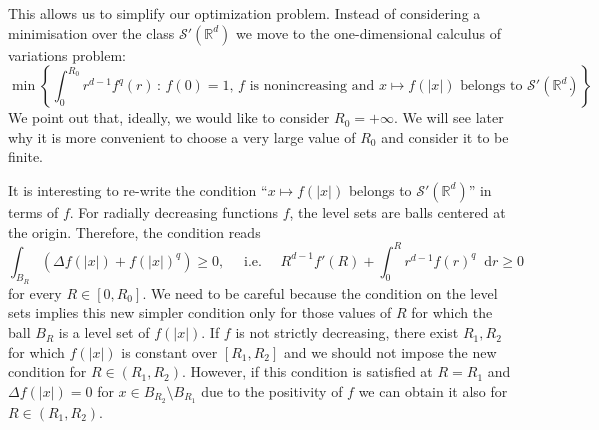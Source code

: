 \documentclass[11pt,a4paper]{article}
\numberwithin{equation}{section}
\newcommand{\R}{{\mathbb{R}}}
\newcommand{\Rd}{{\R^d}}
\theoremstyle{plain}
\newtheorem{lemma}[theorem]{Lemma}
\theoremstyle{remark}
\newcommand {\f}{\frac}
\newcommand{\diff}{\mathop{}\!\mathrm{d}}
\begin{document}
%
%
%
%
%
%
%
%
This allows us to simplify our optimization problem. Instead of considering a minimisation over the class $\mathcal S'(\Rd)$ we move to the one-dimensional calculus of variations problem: 
$$
\min\left\{\int_0^{R_0} r^{d-1}f^q(r)\,:\, f(0)=1,\, f \text{ is nonincreasing and }  x\mapsto f(|x|) \text{ belongs to } \mathcal{S'}(\R^d)\right\}.
$$
We point out that, ideally, we would like to consider $R_0=+\infty$. We will see later why it is more convenient to choose a very large value of $R_0$ and consider it to be finite.

It is interesting to re-write the condition  ``$x\mapsto f(|x|)$ belongs to $\mathcal{S'}(\R^d)$'' in terms of $f$. For radially decreasing functions $f$, the level sets are balls centered at the origin. Therefore, the condition reads 
$$
    \int_{B_R}\left( \Delta f(|x|)+f(|x|)^q\right)\geq 0, \quad \mbox{ i.e. } \quad R^{d-1}f'(R)+\int_0^R r^{d-1}f(r)^q\diff r\geq 0
$$
for every $R\in [0,R_0]$. We need to be careful because the condition on the level sets implies this new simpler condition only for those values of $R$ for which the ball $B_R$ is a level set of $f(|x|)$. If $f$ is not strictly decreasing, there exist $R_1, R_2$ for which $f(|x|)$ is constant over $[R_1, R_2]$ and we should not impose the new condition for $R \in (R_1, R_2)$. However, if this condition is satisfied at $R=R_1$ and $\Delta f(|x|) = 0$ for $x \in B_{R_2} \setminus B_{R_1}$ due to the positivity of $f$ we can obtain it also for $R\in (R_1,R_2)$. 
\end{document}
